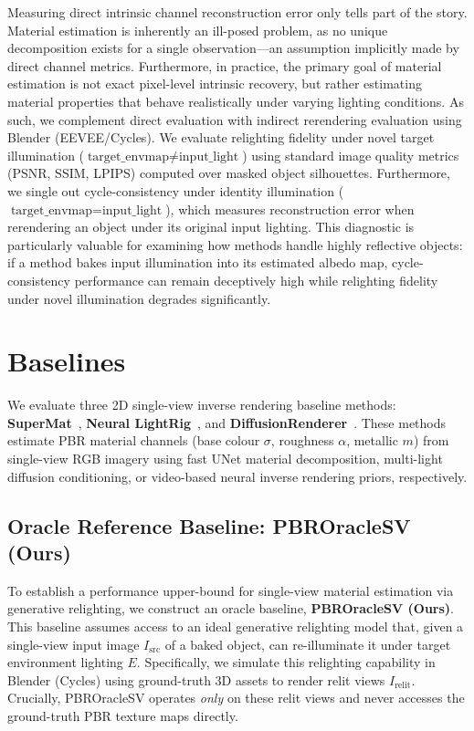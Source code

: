 \documentclass[11pt]{article}
\begin{document}
Measuring direct intrinsic channel reconstruction error only tells part of the story. Material estimation is inherently an ill-posed problem, as no unique decomposition exists for a single observation—an assumption implicitly made by direct channel metrics. Furthermore, in practice, the primary goal of material estimation is not exact pixel-level intrinsic recovery, but rather estimating material properties that behave realistically under varying lighting conditions. As such, we complement direct evaluation with indirect rerendering evaluation using Blender (EEVEE/Cycles). We evaluate relighting fidelity under novel target illumination ($\text{target\_envmap} \neq \text{input\_light}$) using standard image quality metrics (PSNR, SSIM, LPIPS) computed over masked object silhouettes. Furthermore, we single out cycle-consistency under identity illumination ($\text{target\_envmap} = \text{input\_light}$), which measures reconstruction error when rerendering an object under its original input lighting. This diagnostic is particularly valuable for examining how methods handle highly reflective objects: if a method bakes input illumination into its estimated albedo map, cycle-consistency performance can remain deceptively high while relighting fidelity under novel illumination degrades significantly.

\section{Baselines}

We evaluate three 2D single-view inverse rendering baseline methods: \textbf{SuperMat}~\cite{supermat}, \textbf{Neural LightRig}~\cite{neurallightrig}, and \textbf{DiffusionRenderer}~\cite{diffusionrenderer}. These methods estimate PBR material channels (base colour $\sigma$, roughness $\alpha$, metallic $m$) from single-view RGB imagery using fast UNet material decomposition, multi-light diffusion conditioning, or video-based neural inverse rendering priors, respectively.

\subsection{Oracle Reference Baseline: PBROracleSV (Ours)}

To establish a performance upper-bound for single-view material estimation via generative relighting, we construct an oracle baseline, \textbf{PBROracleSV (Ours)}. This baseline assumes access to an ideal generative relighting model that, given a single-view input image $I_{\text{src}}$ of a baked object, can re-illuminate it under target environment lighting $E$. Specifically, we simulate this relighting capability in Blender (Cycles) using ground-truth 3D assets to render relit views $I_{\text{relit}}$. Crucially, PBROracleSV operates \emph{only} on these relit views and never accesses the ground-truth PBR texture maps directly.
\end{document}
